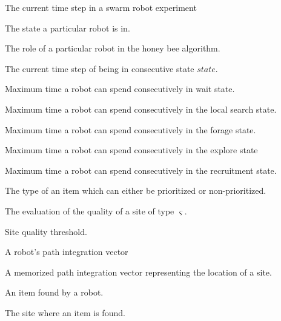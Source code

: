 \begin{description}
\setlength{\itemsep}{-1mm}
	\item[\parbox{\namewidth}{$i$}] The current time step in a swarm robot experiment
	
\item[\parbox{\namewidth}{$state$}] The state a particular robot is in.

\item[\parbox{\namewidth}{$role$}] The role of a particular robot in the honey bee algorithm.

	\item[\parbox{\namewidth}{$i_{state}$}] The current time step of being in consecutive state $state$.
	
	\item[\parbox{\namewidth}{$t_{wait}$}] Maximum time a robot can spend consecutively in wait state.
	
	\item[\parbox{\namewidth}{$t_{ls}$}] Maximum time a robot can spend consecutively in the local search state.
	
	\item[\parbox{\namewidth}{$t_{forage}$}] Maximum time a robot can spend consecutively in the forage state.

	\item[\parbox{\namewidth}{$t_{explore}$}] Maximum time a robot can spend consecutively in the explore state


	\item[\parbox{\namewidth}{$t_{dance}$}] Maximum time a robot can spend consecutively in the recruitment state.
	
	
	\item[\parbox{\namewidth}{$\varsigma$}] The type of an item which can either be prioritized or non-prioritized.

	\item[\parbox{\namewidth}{$\mu_\varsigma$}] The evaluation of the quality of a site of type $\varsigma$.
	
	\item[\parbox{\namewidth}{$\Phi$}] Site quality threshold.
	
	\item[\parbox{\namewidth}{$v$}] A robot's path integration vector

	\item[\parbox{\namewidth}{$\omega$}] A memorized path integration vector representing the location of a site.
	
	\item[\parbox{\namewidth}{$\vartheta$}] An item found by a robot.
	\item[\parbox{\namewidth}{$\xi$}] The site where an item is found.


\end{description}
